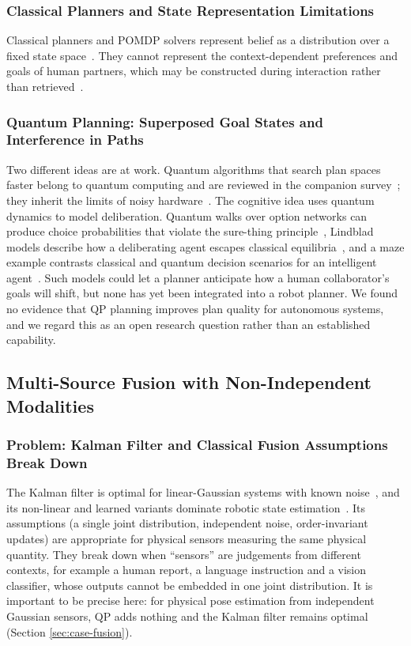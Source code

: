 \documentclass[pdflatex,sn-basic]{sn-jnl}
\begin{document}
\subsubsection{Classical Planners and State Representation Limitations}
Classical planners and POMDP solvers represent belief as a distribution over a fixed state space~\citep{Lauri2023}. They cannot represent the context-dependent preferences and goals of human partners, which may be constructed during interaction rather than retrieved~\citep{Kvam2021}.

\subsubsection{Quantum Planning: Superposed Goal States and Interference in Paths}
Two different ideas are at work. Quantum algorithms that search plan spaces faster belong to quantum computing and are reviewed in the companion survey~\citep{Guru2026}; they inherit the limits of noisy hardware~\citep{Preskill2018}. The cognitive idea uses quantum dynamics to model deliberation. Quantum walks over option networks can produce choice probabilities that violate the sure-thing principle~\citep{MartinezMartinez2016}, Lindblad models describe how a deliberating agent escapes classical equilibria~\citep{Asano2026}, and a maze example contrasts classical and quantum decision scenarios for an intelligent agent~\citep{Kak2018}. Such models could let a planner anticipate how a human collaborator's goals will shift, but none has yet been integrated into a robot planner. We found no evidence that QP planning improves plan quality for autonomous systems, and we regard this as an open research question rather than an established capability.

\subsection{Multi-Source Fusion with Non-Independent Modalities}\label{sec:fusion}

\subsubsection{Problem: Kalman Filter and Classical Fusion Assumptions Break Down}
The Kalman filter is optimal for linear-Gaussian systems with known noise~\citep{Kalman1960}, and its non-linear and learned variants dominate robotic state estimation~\citep{Haykin2001,Thrun2005}. Its assumptions (a single joint distribution, independent noise, order-invariant updates) are appropriate for physical sensors measuring the same physical quantity. They break down when ``sensors'' are judgements from different contexts, for example a human report, a language instruction and a vision classifier, whose outputs cannot be embedded in one joint distribution. It is important to be precise here: for physical pose estimation from independent Gaussian sensors, QP adds nothing and the Kalman filter remains optimal (Section \ref{sec:case-fusion}).
\end{document}
